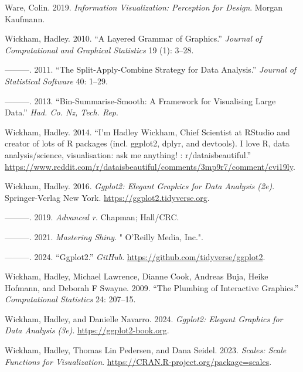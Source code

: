 \documentclass[
]{book}
\newlength{\cslhangindent}
\newenvironment{CSLReferences}[2] %
 {\begin{list}{}{%
  \setlength{\itemindent}{0pt}
  \setlength{\leftmargin}{0pt}
  \setlength{\parsep}{0pt}
  \ifodd #1
   \setlength{\leftmargin}{\cslhangindent}
   \setlength{\itemindent}{-1\cslhangindent}
  \fi
  \setlength{\itemsep}{#2\baselineskip}}}
 {\end{list}}
\theoremstyle{definition}
\theoremstyle{definition}
\theoremstyle{definition}
\theoremstyle{definition}
\theoremstyle{remark}
\begin{document}
\begin{CSLReferences}{1}{0}
Ware, Colin. 2019. \emph{Information Visualization: Perception for Design}. Morgan Kaufmann.

Wickham, Hadley. 2010. {``A Layered Grammar of Graphics.''} \emph{Journal of Computational and Graphical Statistics} 19 (1): 3--28.

---------. 2011. {``The Split-Apply-Combine Strategy for Data Analysis.''} \emph{Journal of Statistical Software} 40: 1--29.

---------. 2013. {``Bin-Summarise-Smooth: A Framework for Visualising Large Data.''} \emph{Had. Co. Nz, Tech. Rep}.

Wickham, Hadley. 2014. {``{I'm Hadley Wickham, Chief Scientist at RStudio and creator of lots of R packages (incl. ggplot2, dplyr, and devtools). I love R, data analysis/science, visualisation: ask me anything! : r/dataisbeautiful}.''} \url{https://www.reddit.com/r/dataisbeautiful/comments/3mp9r7/comment/cvi19ly}.

Wickham, Hadley. 2016. \emph{Ggplot2: Elegant Graphics for Data Analysis (2e)}. Springer-Verlag New York. \url{https://ggplot2.tidyverse.org}.

---------. 2019. \emph{Advanced r}. Chapman; Hall/CRC.

---------. 2021. \emph{Mastering Shiny}. " O'Reilly Media, Inc.".

---------. 2024. {``Ggplot2.''} \emph{GitHub}. \url{https://github.com/tidyverse/ggplot2}.

Wickham, Hadley, Michael Lawrence, Dianne Cook, Andreas Buja, Heike Hofmann, and Deborah F Swayne. 2009. {``The Plumbing of Interactive Graphics.''} \emph{Computational Statistics} 24: 207--15.

Wickham, Hadley, and Danielle Navarro. 2024. \emph{Ggplot2: Elegant Graphics for Data Analysis (3e)}. \url{https://ggplot2-book.org}.

Wickham, Hadley, Thomas Lin Pedersen, and Dana Seidel. 2023. \emph{Scales: Scale Functions for Visualization}. \url{https://CRAN.R-project.org/package=scales}.


\end{CSLReferences}
\end{document}
